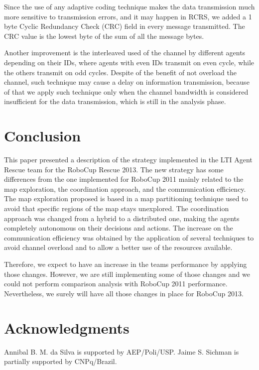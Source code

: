 \documentclass{llncs}
\begin{document}
Since the use of any adaptive coding technique makes the data transmission much more sensitive to transmission errors, and it may happen in RCRS, we added a 1 byte Cyclic Redundancy Check (CRC) field in every message transmitted. The CRC value is the lowest byte of the sum of all the message bytes.

Another improvement is the interleaved used of the channel by different agents depending on their IDs, where agents with even IDs transmit on even cycle, while the others transmit on odd cycles. Despite of the benefit of not overload the channel, such technique may cause a delay on information transmission, because of that we apply such technique only when the channel bandwidth is considered insufficient for the data transmission, which is still in the analysis phase.
\section{Conclusion}
\label{sec:conclusion}
This paper presented a description of the strategy implemented in the LTI Agent Rescue team for the RoboCup Rescue 2013. The new strategy has some differences from the one implemented for RoboCup 2011 mainly related to the map exploration, the coordination approach, and the communication efficiency. The map exploration proposed is based in a map partitioning technique used to avoid that specific regions of the map stays unexplored. The coordination approach was changed from a hybrid to a distributed one, making the agents completely autonomous on their decisions and actions. The increase on the communication efficiency was obtained by the application of several techniques to avoid channel overload and to allow a better use of the resources available.

Therefore, we expect to have an increase in the teams performance by applying those changes. However, we are still implementing some of those changes and we could not perform comparison analysis with RoboCup 2011 performance. Nevertheless, we surely will have all those changes in place for RoboCup 2013.
\section*{Acknowledgments}
\label{sec:acknowledgments}
Annibal B. M. da Silva is supported by AEP/Poli/USP. Jaime S. Sichman is partially supported by CNPq/Brazil.


\end{document}
